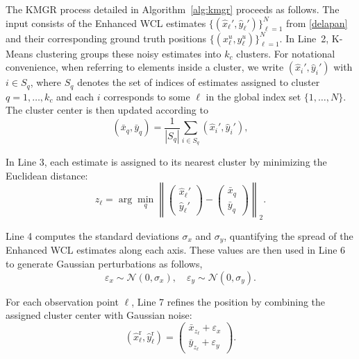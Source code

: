 \documentclass[journal]{IEEEtran}
\begin{document}
The KMGR process detailed in Algorithm~\ref{alg:kmgr} proceeds as follows. 
The input consists of the Enhanced WCL estimates 
$\{(\hat{x}_\ell', \hat{y}_\ell')\}_{\ell=1}^N$ from \eqref{delapan} and their corresponding ground truth positions $\{(x_\ell^u, y_\ell^u)\}_{\ell=1}^N$. 
In Line~2, K-Means clustering groups these noisy estimates into $k_c$ clusters. 
For notational convenience, when referring to elements inside a cluster, we write 
$(\hat{x}_i', \hat{y}_i')$ with $i \in S_q$, where $S_q$ denotes the set of indices of estimates assigned to cluster $q = 1, \ldots, k_c$ and each $i$ corresponds to some $\ell$ in the global index set $\{1,\dots,N\}$. 
The cluster center is then updated according to
\begin{equation}
\label{eq:centroid}
(\bar{x}_q, \bar{y}_q) = \frac{1}{|S_q|} \sum_{i \in S_q} (\hat{x}_i', \hat{y}_i'),
\end{equation}


In Line 3, each estimate is assigned to its nearest cluster by minimizing the Euclidean distance:
\begin{equation}
\label{eq:distance}
z_\ell = \arg\min_{q} \left\| \begin{pmatrix} \hat{x}_\ell' \\ \hat{y}_\ell' \end{pmatrix} - \begin{pmatrix} \bar{x}_q \\ \bar{y}_q \end{pmatrix} \right\|_2.
\end{equation}

Line 4 computes the standard deviations $\sigma_x$ and $\sigma_y$, quantifying the spread of the Enhanced WCL estimates along each axis. These values are then used in Line 6 to generate Gaussian perturbations as follows,
\begin{equation}
\label{eq:gaussian}
\varepsilon_x \sim \mathcal{N}(0, \sigma_x), \quad
\varepsilon_y \sim \mathcal{N}(0, \sigma_y).
\end{equation}

For each observation point $\ell$, Line 7 refines the position by combining the assigned cluster center with Gaussian noise:
\begin{equation}
\label{eq:refined}
(\hat{x}_\ell^\text{r}, \hat{y}_\ell^\text{r}) = 
\begin{pmatrix} \bar{x}_{z_\ell} + \varepsilon_x \\ \bar{y}_{z_\ell} + \varepsilon_y \end{pmatrix}.
\end{equation}
\end{document}
